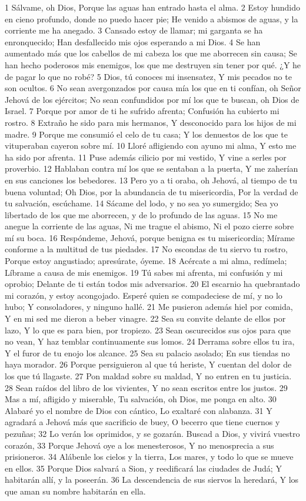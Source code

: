 1 Sálvame, oh Dios,
Porque las aguas han entrado hasta el alma.
2 Estoy hundido en cieno profundo, donde no puedo hacer pie;
He venido a abismos de aguas, y la corriente me ha anegado.
3 Cansado estoy de llamar; mi garganta se ha enronquecido;
Han desfallecido mis ojos esperando a mi Dios.
4 Se han aumentado más que los cabellos de mi cabeza los que me aborrecen sin causa;
Se han hecho poderosos mis enemigos, los que me destruyen sin tener por qué.
¿Y he de pagar lo que no robé?
5 Dios, tú conoces mi insensatez,
Y mis pecados no te son ocultos.
6 No sean avergonzados por causa mía los que en ti confían, oh Señor Jehová de los ejércitos;
No sean confundidos por mí los que te buscan, oh Dios de Israel.
7 Porque por amor de ti he sufrido afrenta;
Confusión ha cubierto mi rostro.
8 Extraño he sido para mis hermanos,
Y desconocido para los hijos de mi madre.
9 Porque me consumió el celo de tu casa;
Y los denuestos de los que te vituperaban cayeron sobre mí.
10 Lloré afligiendo con ayuno mi alma,
Y esto me ha sido por afrenta.
11 Puse además cilicio por mi vestido,
Y vine a serles por proverbio.
12 Hablaban contra mí los que se sentaban a la puerta,
Y me zaherían en sus canciones los bebedores.
13 Pero yo a ti oraba, oh Jehová, al tiempo de tu buena voluntad;
Oh Dios, por la abundancia de tu misericordia,
Por la verdad de tu salvación, escúchame.
14 Sácame del lodo, y no sea yo sumergido;
Sea yo libertado de los que me aborrecen, y de lo profundo de las aguas.
15 No me anegue la corriente de las aguas,
Ni me trague el abismo,
Ni el pozo cierre sobre mí su boca.
16 Respóndeme, Jehová, porque benigna es tu misericordia;
Mírame conforme a la multitud de tus piedades.
17 No escondas de tu siervo tu rostro,
Porque estoy angustiado; apresúrate, óyeme.
18 Acércate a mi alma, redímela;
Líbrame a causa de mis enemigos.
19 Tú sabes mi afrenta, mi confusión y mi oprobio;
Delante de ti están todos mis adversarios.
20 El escarnio ha quebrantado mi corazón, y estoy acongojado.
Esperé quien se compadeciese de mí, y no lo hubo;
Y consoladores, y ninguno hallé.
21 Me pusieron además hiel por comida,
Y en mi sed me dieron a beber vinagre.
22 Sea su convite delante de ellos por lazo,
Y lo que es para bien, por tropiezo.
23 Sean oscurecidos sus ojos para que no vean,
Y haz temblar continuamente sus lomos.
24 Derrama sobre ellos tu ira,
Y el furor de tu enojo los alcance.
25 Sea su palacio asolado;
En sus tiendas no haya morador.
26 Porque persiguieron al que tú heriste,
Y cuentan del dolor de los que tú llagaste.
27 Pon maldad sobre su maldad,
Y no entren en tu justicia.
28 Sean raídos del libro de los vivientes,
Y no sean escritos entre los justos.
29 Mas a mí, afligido y miserable,
Tu salvación, oh Dios, me ponga en alto.
30 Alabaré yo el nombre de Dios con cántico,
Lo exaltaré con alabanza.
31 Y agradará a Jehová más que sacrificio de buey,
O becerro que tiene cuernos y pezuñas;
32 Lo verán los oprimidos, y se gozarán.
Buscad a Dios, y vivirá vuestro corazón,
33 Porque Jehová oye a los menesterosos,
Y no menosprecia a sus prisioneros.
34 Alábenle los cielos y la tierra,
Los mares, y todo lo que se mueve en ellos.
35 Porque Dios salvará a Sion, y reedificará las ciudades de Judá;
Y habitarán allí, y la poseerán.
36 La descendencia de sus siervos la heredará,
Y los que aman su nombre habitarán en ella.

